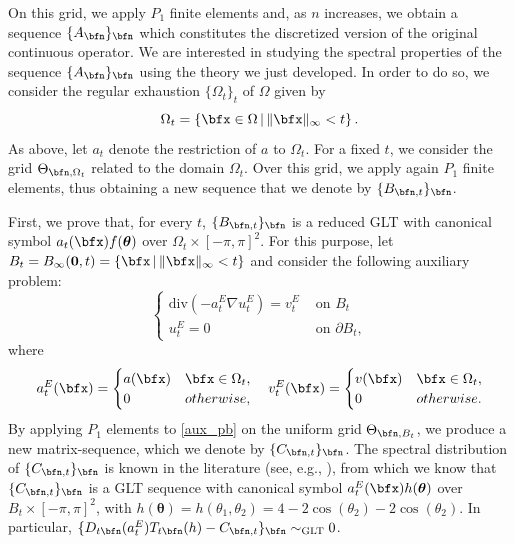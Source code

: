 \documentclass{amsart}
\newcommand{\bftheta}{{\boldsymbol\theta}}
\begin{document}
On this grid, we apply $P_1$ finite elements and, as $n$ increases, we obtain a sequence $\{A_{\bfn}\}_{\bfn}$ which constitutes the discretized version of the original continuous operator. We are interested in studying the spectral properties of the sequence $\{A_{\bfn}\}_{\bfn}$ using the theory we just developed. In order to do so, we consider the regular exhaustion $\{\Omega_t\}_t$ of $\Omega$ given by
\begin{equation*}
    \Omega_t = \left\{\bfx\in\Omega\,\vert\,\|\bfx\|_\infty<t\right\}.
\end{equation*}
As above, let $a_t$ denote the restriction of $a$ to $\Omega_t$.
For a fixed $t$, we consider the grid $\Theta_{\bfn,\Omega_t}$ related to the domain $\Omega_t$. Over this grid, we apply again $P_1$ finite elements, thus obtaining a new sequence that we denote by $\{B_{\bfn,t}\}_{\bfn}$. 

First, we prove that, for every $t$, $\{B_{\bfn,t}\}_{\bfn}$ is a reduced GLT with canonical symbol $a_t(\bfx)f(\bftheta)$ over $\Omega_t \times [-\pi,\pi]^2$. For this purpose, let $B_t = B_{\infty}({\bf0},t)= \left\{\bfx \,\vert\,\|\bfx\|_\infty<t\right\} $ and consider the following auxiliary problem:
\begin{equation}\label{aux_pb}
    \begin{cases}
        \text{div}(-a_t^E \nabla u_t^E)= v_t^E & \text{ on } B_t \\
        u_t^E=0 & \text{ on } \partial B_t,
    \end{cases}
\end{equation}
where
\begin{equation*}
    a_t^E(\bfx) = \begin{cases}
        a(\bfx) & \bfx \in \Omega_t, \\
        0 & otherwise,
    \end{cases} \quad v_t^E(\bfx) = \begin{cases}
        v(\bfx) & \bfx \in \Omega_t, \\
        0 & otherwise.
    \end{cases}
\end{equation*}
By applying $P_1$ elements to \eqref{aux_pb} on the uniform grid $\Theta_{\bfn,B_t}$, we produce a new matrix-sequence, which we denote by $\{C_{\bfn,t}\}_{\bfn}$. The spectral distribution of $\{C_{\bfn,t}\}_{\bfn}$ is known in the literature (see, e.g., \cite[Section 7]{Barb}), from which we know that $\{C_{\bfn,t}\}_{\bfn} $ is a GLT sequence with canonical symbol $ a_t^E(\bfx)h(\bftheta)$ over $B_t \times [-\pi,\pi]^2$, with $h(\bftheta)=h(\theta_1,\theta_2)=4-2\cos(\theta_2)-2\cos(\theta_2)$. In particular, $\{D_{t\bfn}(a_t^E) T_{t \bfn}(h)-C_{\bfn,t}\}_{\bfn} \sim_{\mathrm{GLT}} 0$.
\end{document}
